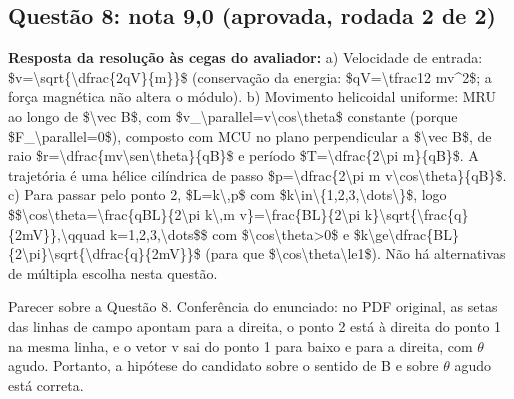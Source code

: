 \documentclass{article}%
\begin{document}
\subsection*{Questão 8: nota 9,0 (aprovada, rodada 2 de 2)}%
\textbf{Resposta da resolução às cegas do avaliador:} a) Velocidade de entrada: \$v=\textbackslash{}sqrt\{\textbackslash{}dfrac\{2qV\}\{m\}\}\$ (conservação da energia: \$qV=\textbackslash{}tfrac12 mv\^{}2\$; a força magnética não altera o módulo).\newline%
\newline%
b) Movimento helicoidal uniforme: MRU ao longo de \$\textbackslash{}vec B\$, com \$v\_\textbackslash{}parallel=v\textbackslash{}cos\textbackslash{}theta\$ constante (porque \$F\_\textbackslash{}parallel=0\$), composto com MCU no plano perpendicular a \$\textbackslash{}vec B\$, de raio \$r=\textbackslash{}dfrac\{mv\textbackslash{}sen\textbackslash{}theta\}\{qB\}\$ e período \$T=\textbackslash{}dfrac\{2\textbackslash{}pi m\}\{qB\}\$. A trajetória é uma hélice cilíndrica de passo \$p=\textbackslash{}dfrac\{2\textbackslash{}pi m v\textbackslash{}cos\textbackslash{}theta\}\{qB\}\$.\newline%
\newline%
c) Para passar pelo ponto 2, \$L=k\textbackslash{},p\$ com \$k\textbackslash{}in\textbackslash{}\{1,2,3,\textbackslash{}dots\textbackslash{}\}\$, logo\newline%
\$\$\textbackslash{}cos\textbackslash{}theta=\textbackslash{}frac\{qBL\}\{2\textbackslash{}pi k\textbackslash{},m v\}=\textbackslash{}frac\{BL\}\{2\textbackslash{}pi k\}\textbackslash{}sqrt\{\textbackslash{}frac\{q\}\{2mV\}\},\textbackslash{}qquad k=1,2,3,\textbackslash{}dots\$\$\newline%
com \$\textbackslash{}cos\textbackslash{}theta>0\$ e \$k\textbackslash{}ge\textbackslash{}dfrac\{BL\}\{2\textbackslash{}pi\}\textbackslash{}sqrt\{\textbackslash{}dfrac\{q\}\{2mV\}\}\$ (para que \$\textbackslash{}cos\textbackslash{}theta\textbackslash{}le1\$).\newline%
\newline%
Não há alternativas de múltipla escolha nesta questão.\par %
Parecer sobre a Questão 8.\newline%
\newline%
Conferência do enunciado: no PDF original, as setas das linhas de campo apontam para a direita, o ponto 2 está à direita do ponto 1 na mesma linha, e o vetor v sai do ponto 1 para baixo e para a direita, com $\theta$ agudo. Portanto, a hipótese do candidato sobre o sentido de B e sobre $\theta$ agudo está correta.\newline%
\end{document}
